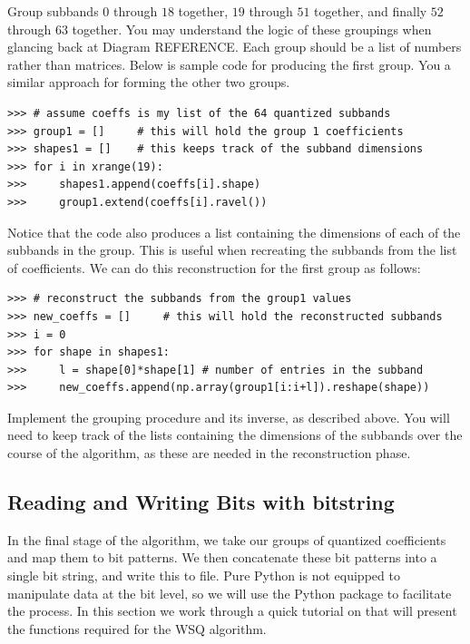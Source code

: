 Group subbands $0$ through $18$ together, $19$ through $51$ together, and finally $52$ through $63$
together. You may understand the logic of these groupings when glancing back at Diagram REFERENCE.
Each group should be a list of numbers rather than matrices. Below is sample code for producing the
first group. You a similar approach for forming the other two groups.
\begin{lstlisting}
>>> # assume coeffs is my list of the 64 quantized subbands
>>> group1 = []     # this will hold the group 1 coefficients
>>> shapes1 = []    # this keeps track of the subband dimensions
>>> for i in xrange(19):
>>>     shapes1.append(coeffs[i].shape)
>>>     group1.extend(coeffs[i].ravel())
\end{lstlisting}
Notice that the code also produces a list containing the dimensions of each of the subbands in the group.
This is useful when recreating the subbands from the list of coefficients. We can do this
reconstruction for the first group as follows:
\begin{lstlisting}
>>> # reconstruct the subbands from the group1 values
>>> new_coeffs = []     # this will hold the reconstructed subbands
>>> i = 0
>>> for shape in shapes1:
>>>     l = shape[0]*shape[1] # number of entries in the subband
>>>     new_coeffs.append(np.array(group1[i:i+l]).reshape(shape))
\end{lstlisting}
\begin{problem}
Implement the grouping procedure and its inverse, as described above. You will need to
keep track of the lists containing the dimensions of the subbands over the course
of the algorithm, as these are needed in the reconstruction phase.
\end{problem}
\subsection*{Reading and Writing Bits with bitstring}
In the final stage of the algorithm, we take our groups of quantized coefficients
and map them to bit patterns. We then concatenate these bit patterns into a single
bit string, and write this to file. Pure Python is not equipped to manipulate data
at the bit level, so we will use the Python package  to facilitate
the process. In this section we work through a quick tutorial on  
that will present the functions required for the WSQ algorithm.


